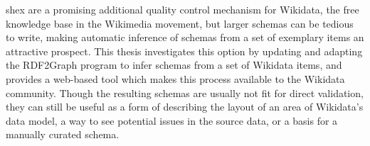 
\Abstract
\acrlong{shex} are a promising additional quality control mechanism for Wikidata,
the free knowledge base in the Wikimedia movement,
but larger schemas can be tedious to write,
making automatic inference of schemas from a set of exemplary items an attractive prospect. %
This thesis investigates %
this option by updating and adapting the RDF2Graph program to infer schemas from a set of Wikidata items,
and provides a web-based tool which makes this process available to the Wikidata community.
Though the resulting schemas are usually not fit for direct validation,
they can still be useful as a form of describing the layout of an area of Wikidata’s data model,
a way to see potential issues in the source data, %
or a basis for a manually curated schema.
